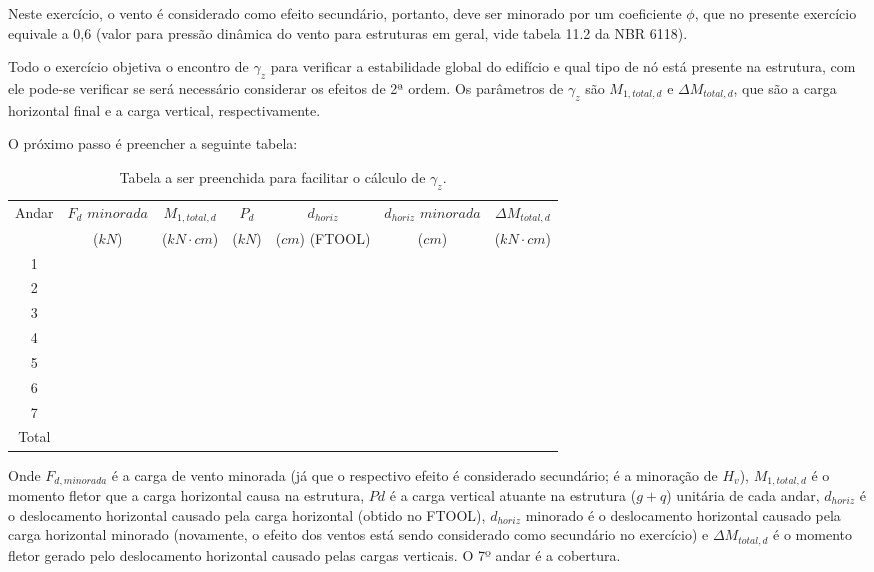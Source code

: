 
Neste exercício, o vento é considerado como efeito secundário, portanto, deve ser minorado por um coeficiente $\phi$, que no presente exercício equivale a 0,6 (valor para pressão dinâmica do vento para estruturas em geral, vide tabela 11.2 da NBR 6118).

Todo o exercício objetiva o encontro de $\gamma_z$ para verificar a estabilidade global do edifício e qual tipo de nó está presente na estrutura, com ele pode-se verificar se será necessário considerar os efeitos de 2ª ordem. Os parâmetros de $\gamma_z$ são $M_{1, total, d}$ e $\Delta M_{total, d}$, que são a carga horizontal final e a carga vertical, respectivamente.

O próximo passo é preencher a seguinte tabela:

\begin{table}[H]
\centering
\caption{Tabela a ser preenchida para facilitar o cálculo de $\gamma_z$.}
\label{tab:Tabela-exercicio-vento}
\begin{tabular}{c|c|c|ccc|c}
\hline
Andar & $F_d$ $minorada$ & $M_{1, total, d}$ & \multicolumn{1}{c|}{$P_d$} & \multicolumn{1}{c|}{$d_{horiz}$} & $d_{horiz}$ $minorada$ & $\Delta M_{total, d}$ \\
 & ($kN$) & ($kN\cdot cm$) & \multicolumn{1}{c|}{($kN$)} & \multicolumn{1}{c|}{($cm$) (FTOOL)} & ($cm$) & ($kN\cdot cm$) \\ \hline
1 &  &  & \multicolumn{1}{c|}{} & \multicolumn{1}{c|}{} &  &  \\
2 &  &  & \multicolumn{1}{c|}{} & \multicolumn{1}{c|}{} &  &  \\
3 &  &  & \multicolumn{1}{c|}{} & \multicolumn{1}{c|}{} &  &  \\
4 &  &  & \multicolumn{1}{c|}{} & \multicolumn{1}{c|}{} &  &  \\
5 &  &  & \multicolumn{1}{c|}{} & \multicolumn{1}{c|}{} &  &  \\
6 &  &  & \multicolumn{1}{c|}{} & \multicolumn{1}{c|}{} &  &  \\
7 &  &  & \multicolumn{1}{c|}{} & \multicolumn{1}{c|}{} &  &  \\ \hline
Total &  &  &  &  &  &  \\ \cline{1-1} \cline{3-3} \cline{7-7} 
\end{tabular}
\end{table}

Onde $F_{d, minorada}$ é a carga de vento minorada (já que o respectivo efeito é considerado secundário; é a minoração de $H_v$), $M_{1, total, d}$ é o momento fletor que a carga horizontal causa na estrutura, $Pd$ é a carga vertical atuante na estrutura ($g+q$) unitária de cada andar, $d_{horiz}$ é o deslocamento horizontal causado pela carga horizontal (obtido no FTOOL), $d_{horiz}$ minorado é o deslocamento horizontal causado pela carga horizontal minorado (novamente, o efeito dos ventos está sendo considerado como secundário no exercício) e $\Delta M_{total, d}$ é o momento fletor gerado pelo deslocamento horizontal causado pelas cargas verticais. O 7º andar é a cobertura.

